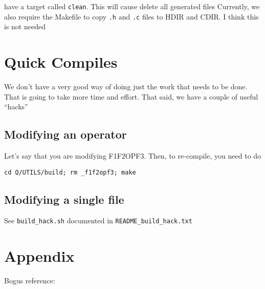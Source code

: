\item have a target called {\tt clean}. This will cause delete all generated
files
\ee
Currently, we also require the Makefile to copy {\tt .h} and {\tt .c} files to
HDIR and CDIR. I think this is not needed \TBC

\section{Quick Compiles}

We don't have a very good way of doing just the work that needs to be done. That
is going to take more time and effort. That said, we have a couple of useful
``hacks''
\subsection{Modifying an operator}
Let's say that you are modifying F1F2OPF3. Then, to re-compile, you need to do 
\begin{verbatim}
cd Q/UTILS/build; rm _f1f2opf3; make 
\end{verbatim}

\subsection{Modifying a single file}
See \verb+build_hack.sh+ documented in \verb+README_build_hack.txt+

\section{Appendix}

Bogus reference: \cite{sarawagi99}

 




